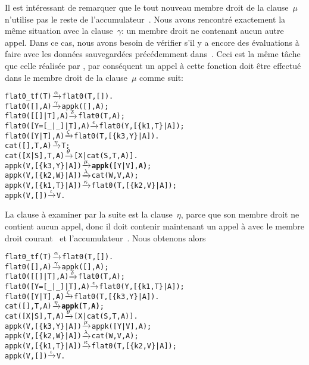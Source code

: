 Il est intéressant de remarquer que le tout nouveau membre droit de la
clause~\(\mu\) n'utilise pas le reste de
l'accumulateur~. Nous avons rencontré exactement la même
situation avec la clause~\(\gamma\): un membre droit ne contenant
aucun autre appel. Dans ce cas, nous avons besoin de vérifier s'il y a
encore des évaluations à faire avec les données sauvegardées
précédemment dans~. Ceci est la même tâche que celle
réalisée par , par conséquent un appel à cette
fonction doit être effectué dans le membre droit de la clause~\(\mu\)
comme suit:
\begin{alltt}
flat0\_tf(T)          \(\smashedrightarrow{\alpha}\) flat0(T,[]).
flat0(         [],A) \(\smashedrightarrow{\gamma}\) appk([],A);
flat0(     [[]|T],A) \(\smashedrightarrow{\delta}\) flat0(T,A);
flat0([Y=[\_|\_]|T],A) \(\smashedrightarrow{\epsilon}\) flat0(Y,[\{k1,T\}|A]);
flat0(      [Y|T],A) \(\smashedrightarrow{\zeta}\) flat0(T,[\{k3,Y\}|A]).
cat(   [],T,A)       \(\smashedrightarrow{\eta}\) T;\hfill% A \emph{inutile pour le moment}
cat([X|S],T,A)       \(\smashedrightarrow{\theta}\) [X|cat(S,T,A)].
appk(V,[\{k3,Y\}|A])   \(\smashedrightarrow{\mu}\) \textbf{appk(}[Y|V],\textbf{A)};
appk(V,[\{k2,W\}|A])   \(\smashedrightarrow{\lambda}\) cat(W,V,A);
appk(V,[\{k1,T\}|A])   \(\smashedrightarrow{\kappa}\) flat0(T,[\{k2,V\}|A]);
appk(V,        [])   \(\smashedrightarrow{\iota}\) V.
\end{alltt}
La clause à examiner par la suite est la clause~\(\eta\), parce que son
membre droit ne contient aucun appel, donc il doit contenir maintenant
un appel à  avec le membre droit courant~
et l'accumulateur~. Nous obtenons alors
\begin{alltt}
flat0\_tf(T)          \(\smashedrightarrow{\alpha}\) flat0(T,[]).
flat0(         [],A) \(\smashedrightarrow{\gamma}\) appk([],A);
flat0(     [[]|T],A) \(\smashedrightarrow{\delta}\) flat0(T,A);
flat0([Y=[\_|\_]|T],A) \(\smashedrightarrow{\epsilon}\) flat0(Y,[\{k1,T\}|A]);
flat0(      [Y|T],A) \(\smashedrightarrow{\zeta}\) flat0(T,[\{k3,Y\}|A]).
cat(   [],T,A)       \(\smashedrightarrow{\eta}\) \textbf{appk(}T,\textbf{A)};
cat([X|S],T,A)       \(\smashedrightarrow{\theta}\) [X|cat(S,T,A)].
appk(V,[\{k3,Y\}|A])   \(\smashedrightarrow{\mu}\) appk([Y|V],A);
appk(V,[\{k2,W\}|A])   \(\smashedrightarrow{\lambda}\) cat(W,V,A);
appk(V,[\{k1,T\}|A])   \(\smashedrightarrow{\kappa}\) flat0(T,[\{k2,V\}|A]);
appk(V,        [])   \(\smashedrightarrow{\iota}\) V.
\end{alltt}
